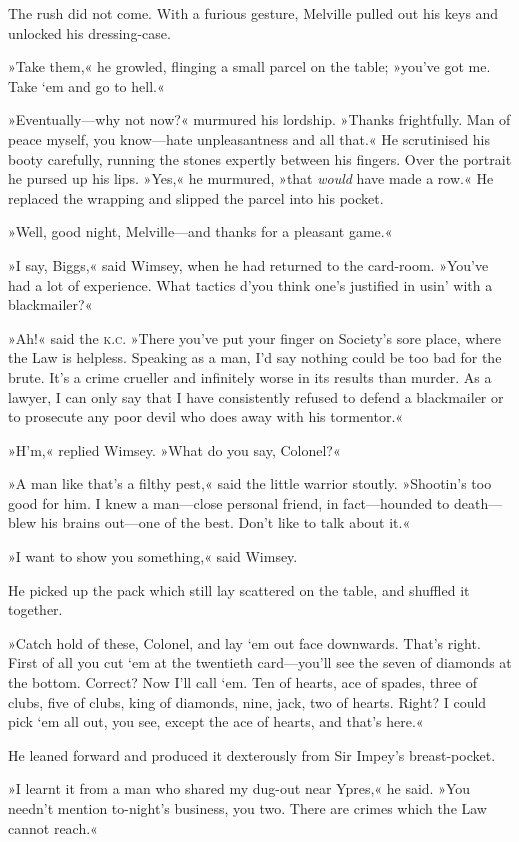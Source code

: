 The rush did not come. With a furious gesture, Melville pulled out his keys and unlocked his dressing-case.

»Take them,« he growled, flinging a small parcel on the table; »you've got me. Take `em and go to hell.«

»Eventually—why not now?« murmured his lordship. »Thanks frightfully. Man of peace myself, you know—hate unpleasantness and all that.« He scrutinised his booty carefully, running the stones expertly between his fingers. Over the portrait he pursed up his lips. »Yes,« he murmured, »that \textit{would} have made a row.« He replaced the wrapping and slipped the parcel into his pocket.

»Well, good night, Melville—and thanks for a pleasant game.«

»I say, Biggs,« said Wimsey, when he had returned to the card-room. »You've had a lot of experience. What tactics d'you think one's justified in usin' with a blackmailer?«

»Ah!« said the \textsc{k.c.} »There you've put your finger on Society's sore place, where the Law is helpless. Speaking as a man, I'd say nothing could be too bad for the brute. It's a crime crueller and infinitely worse in its results than murder. As a lawyer, I can only say that I have consistently refused to defend a blackmailer or to prosecute any poor devil who does away with his tormentor.«

»H'm,« replied Wimsey. »What do you say, Colonel?«

»A man like that's a filthy pest,« said the little warrior stoutly. »Shootin's too good for him. I knew a man—close personal friend, in fact—hounded to death—blew his brains out—one of the best. Don't like to talk about it.«

»I want to show you something,« said Wimsey.

He picked up the pack which still lay scattered on the table, and shuffled it together.

»Catch hold of these, Colonel, and lay `em out face downwards. That's right. First of all you cut `em at the twentieth card—you'll see the seven of diamonds at the bottom. Correct? Now I'll call `em. Ten of hearts, ace of spades, three of clubs, five of clubs, king of diamonds, nine, jack, two of hearts. Right? I could pick `em all out, you see, except the ace of hearts, and that's here.«

He leaned forward and produced it dexterously from Sir Impey's breast-pocket.

»I learnt it from a man who shared my dug-out near Ypres,« he said. »You needn't mention to-night's business, you two. There are crimes which the Law cannot reach.«